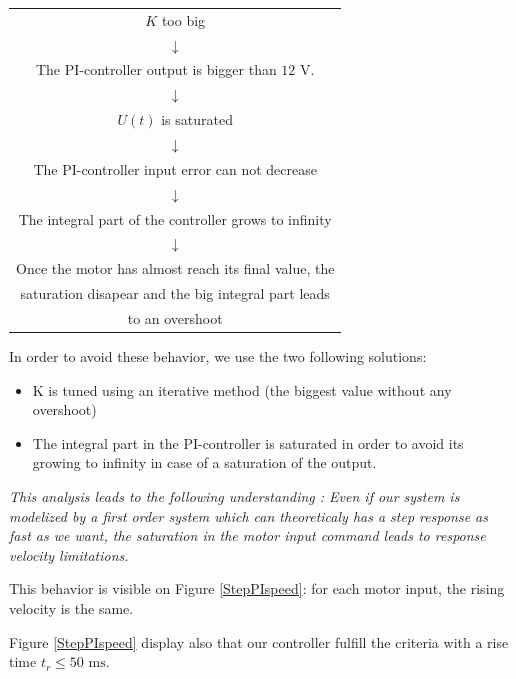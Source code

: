 \begin{center}
\begin{tabular}{c}
  $K$ too big \\ 
  $\downarrow$ \\ The PI-controller output is bigger than $12$ V. \\
  $\downarrow$ \\ $U(t)$ is saturated \\
  $\downarrow$ \\ The PI-controller input error can not decrease \\
  $\downarrow$ \\ The integral part of the controller grows to infinity \\
  $\downarrow$ \\ Once the motor has almost reach its final value, the \\saturation disapear and the big integral part leads\\ to an overshoot
\end{tabular}
\end{center}

In order to avoid these behavior, we use the two following solutions:
\begin{itemize}
 \item K is tuned using an iterative method (the biggest value without any overshoot)
 \item The integral part in the PI-controller is saturated in order to avoid its growing to infinity in case of a saturation of the output.
\end{itemize}

\emph{This analysis leads to the following understanding : 
Even if our system is modelized by a first order system which can theoreticaly has a step response as fast as we want, 
the saturation in the motor input command leads to response velocity limitations.} \ \newline

This behavior is visible on Figure \ref{StepPIspeed}: for each motor input, the rising velocity is the same. 

Figure \ref{StepPIspeed} display also that our controller fulfill the criteria with a rise time $t_r \leq 50 \text{ ms}$.

